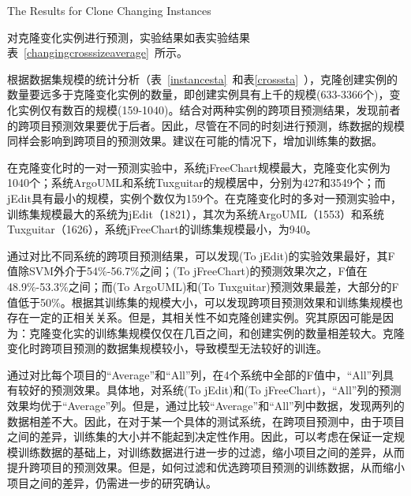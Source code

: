 
{The Results for Clone Changing Instances}

对克隆变化实例进行预测，实验结果如表实验结果表~\ref{changingcrosssizeaverage}~所示。

根据数据集规模的统计分析（表~\ref{instancesta}~和表\ref{crosssta}~），克隆创建实例的数量要远多于克隆变化实例的数量，即创建实例具有上千的规模(633-3366个)，变化实例仅有数百的规模(159-1040)。结合对两种实例的跨项目预测结果，发现前者的跨项目预测效果要优于后者。因此，尽管在不同的时刻进行预测，练数据的规模同样会影响到跨项目的预测效果。建议在可能的情况下，增加训练集的数据。

在克隆变化时的一对一预测实验中，系统jFreeChart规模最大，克隆变化实例为1040个；系统ArgoUML和系统Tuxguitar的规模居中，分别为427和3549个；而jEdit具有最小的规模，实例个数仅为159个。在克隆变化时的多对一预测实验中，训练集规模最大的系统为jEdit（1821），其次为系统ArgoUML（1553）和系统Tuxguitar（1626），系统jFreeChart的训练集规模最小，为940。

通过对比不同系统的跨项目预测结果，可以发现(To jEdit)的实验效果最好，其F值除SVM外介于54\%-56.7\%之间；(To jFreeChart)的预测效果次之，F值在48.9\%-53.3\%之间；而(To ArgoUML)和(To Tuxguitar)预测效果最差，大部分的F值低于50\%。根据其训练集的规模大小，可以发现跨项目预测效果和训练集规模也存在一定的正相关关系。但是，其相关性不如克隆创建实例。究其原因可能是因为：克隆变化实的训练集规模仅仅在几百之间，和创建实例的数量相差较大。克隆变化时跨项目预测的数据集规模较小，导致模型无法较好的训连。%

通过对比每个项目的“Average”和“All”列，在4个系统中全部的F值中，“All”列具有较好的预测效果。具体地，对系统(To jEdit)和(To jFreeChart)，“All”列的预测效果均优于“Average”列。但是，通过比较“Average”和“All”列中数据，发现两列的数据相差不大。因此，在对于某一个具体的测试系统，在跨项目预测中，由于项目之间的差异，训练集的大小并不能起到决定性作用。因此，可以考虑在保证一定规模训练数据的基础上，对训练数据进行进一步的过滤，缩小项目之间的差异，从而提升跨项目的预测效果。但是，如何过滤和优选跨项目预测的训练数据，从而缩小项目之间的差异，仍需进一步的研究确认。

